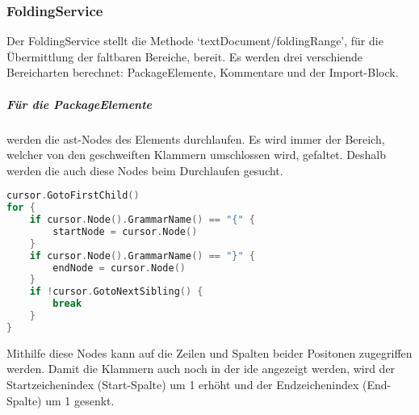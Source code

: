 \documentclass[./einleitung.tex]{subfiles}
\begin{document}
    \subsubsection[FoldingService]{FoldingService }\label{subsubsec:folding-service}
    Der FoldingService stellt die Methode `textDocument/foldingRange', für die Übermittlung der faltbaren Bereiche, bereit.
    Es werden drei verschiende Bereicharten berechnet: PackageElemente, Kommentare und der Import-Block.
    \subparagraph{Für die PackageElemente} werden die \acrshort{ast}-Nodes des Elements durchlaufen.
    Es wird immer der Bereich, welcher von den geschweiften Klammern umschlossen wird, gefaltet.
    Deshalb werden die auch diese Nodes beim Durchlaufen gesucht.
    \begin{lstlisting}[language=Go, caption=Suche nach Start- und Ende-Node des Faltbereichs eines PackageElements, label=lst:foldPackageElement]
cursor.GotoFirstChild()
for {
    if cursor.Node().GrammarName() == "{" {
        startNode = cursor.Node()
    }
    if cursor.Node().GrammarName() == "}" {
        endNode = cursor.Node()
    }
    if !cursor.GotoNextSibling() {
        break
    }
}
    \end{lstlisting}
    Mithilfe diese Nodes kann auf die Zeilen und Spalten beider Positonen zugegriffen werden.
    Damit die Klammern auch noch in der \acrshort{ide} angezeigt werden, wird der Startzeichenindex (Start-Spalte) um 1 erhöht und der Endzeichenindex (End-Spalte) um 1 gesenkt.
\end{document}
